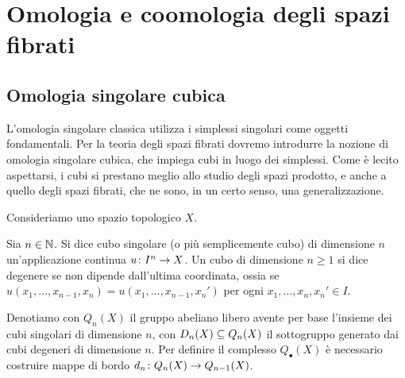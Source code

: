 \chapter{Omologia e coomologia degli spazi fibrati}

\section{Omologia singolare cubica}

L'omologia singolare classica utilizza i simplessi singolari come oggetti fondamentali. Per la teoria degli spazi fibrati dovremo introdurre la nozione di omologia singolare cubica, che impiega cubi in luogo dei simplessi. Come è lecito aspettarsi, i cubi si prestano meglio allo studio degli spazi prodotto, e anche a quello degli spazi fibrati, che ne sono, in un certo senso, una generalizzazione.

Consideriamo uno spazio topologico $X$.

\begin{definition}
Sia $n\in\mathbb{N}$. Si dice cubo singolare (o più semplicemente cubo) di dimensione $n$ un'applicazione continua $u\colon I^n\to X$. Un cubo di dimensione $n\ge 1$ si dice degenere se non dipende dall'ultima coordinata, ossia se $u(x_1,\ldots,x_{n-1},x_n)=u(x_1,\ldots,x_{n-1},x_n')$ per ogni $x_1,\ldots,x_n,x_n'\in I$.
\end{definition}

Denotiamo con $Q_n(X)$ il gruppo abeliano libero avente per base l'insieme dei cubi singolari di dimensione $n$, con $D_n(X)\subseteq Q_n(X)$ il sottogruppo generato dai cubi degeneri di dimensione $n$. Per definire il complesso $Q_\bullet(X)$ è necessario costruire mappe di bordo $d_n\colon Q_n(X)\to Q_{n-1}(X)$.

